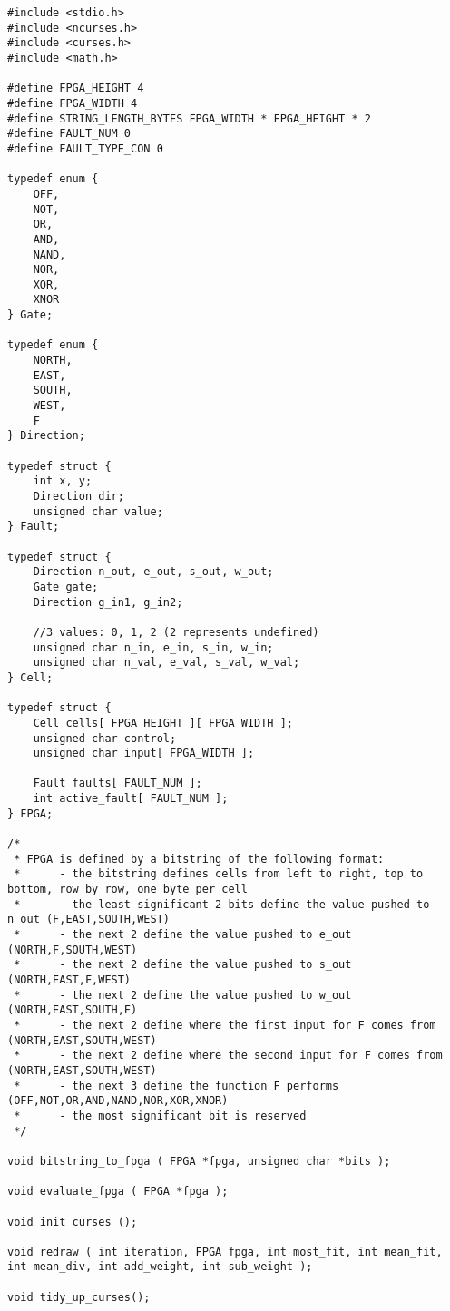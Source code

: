 \documentclass[ %
                    author={Alexander Dalton},
                supervisor={Prof. Seth Bullock},
                    degree={MEng},
                     title={Exploring Evolutionary Hardware:},
                  subtitle={Evolved Binary Arithmetic Circuits and Dynamic Problems},
                      type={research},
                      year={2018} ]{dissertation}
\begin{document}
\begin{lstlisting}
#include <stdio.h>
#include <ncurses.h>
#include <curses.h>
#include <math.h>

#define FPGA_HEIGHT 4
#define FPGA_WIDTH 4
#define STRING_LENGTH_BYTES FPGA_WIDTH * FPGA_HEIGHT * 2
#define FAULT_NUM 0
#define FAULT_TYPE_CON 0

typedef enum {
	OFF,
	NOT,
	OR,
	AND,
	NAND,
	NOR,
	XOR,
	XNOR
} Gate;

typedef enum {
	NORTH,
	EAST,
	SOUTH,
	WEST,
	F
} Direction;

typedef struct {
	int x, y;
	Direction dir;
	unsigned char value;
} Fault;

typedef struct {
	Direction n_out, e_out, s_out, w_out;
	Gate gate;
	Direction g_in1, g_in2;

	//3 values: 0, 1, 2 (2 represents undefined)
	unsigned char n_in, e_in, s_in, w_in;
	unsigned char n_val, e_val, s_val, w_val;
} Cell;

typedef struct {
	Cell cells[ FPGA_HEIGHT ][ FPGA_WIDTH ];
	unsigned char control;
	unsigned char input[ FPGA_WIDTH ];

	Fault faults[ FAULT_NUM ];
	int active_fault[ FAULT_NUM ];
} FPGA;

/*
 * FPGA is defined by a bitstring of the following format:
 * 		- the bitstring defines cells from left to right, top to bottom, row by row, one byte per cell
 * 		- the least significant 2 bits define the value pushed to n_out (F,EAST,SOUTH,WEST)
 * 		- the next 2 define the value pushed to e_out (NORTH,F,SOUTH,WEST)
 * 		- the next 2 define the value pushed to s_out (NORTH,EAST,F,WEST)
 * 		- the next 2 define the value pushed to w_out (NORTH,EAST,SOUTH,F)
 * 		- the next 2 define where the first input for F comes from (NORTH,EAST,SOUTH,WEST)
 * 		- the next 2 define where the second input for F comes from (NORTH,EAST,SOUTH,WEST)
 * 		- the next 3 define the function F performs (OFF,NOT,OR,AND,NAND,NOR,XOR,XNOR)
 * 		- the most significant bit is reserved
 */

void bitstring_to_fpga ( FPGA *fpga, unsigned char *bits );

void evaluate_fpga ( FPGA *fpga );

void init_curses ();

void redraw ( int iteration, FPGA fpga, int most_fit, int mean_fit, int mean_div, int add_weight, int sub_weight );

void tidy_up_curses();
\end{lstlisting}
\end{document}
